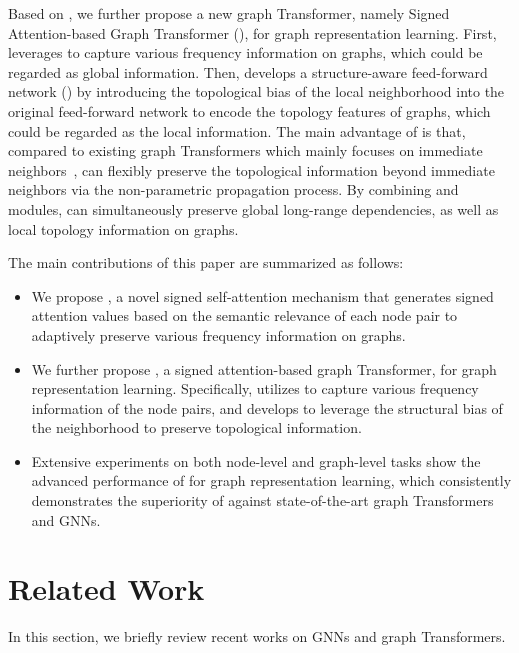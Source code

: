 \documentclass[sigconf, screen]{acmart}
\begin{document}
Based on \saname, we further propose a new graph Transformer, namely Signed Attention-based Graph Transformer (\name), for graph representation learning. 
First, \name leverages \saname to capture various frequency information on graphs, which could be regarded as global information. 
Then, \name develops a structure-aware feed-forward network (\sffn) by introducing the topological bias of the local neighborhood into the original feed-forward network to encode the topology features of graphs, which could be regarded as the local information.
The main advantage of \sffn is that, compared to existing graph Transformers which mainly focuses on immediate neighbors~\cite{nodeformer,gps}, \sffn can  flexibly preserve the topological information beyond immediate neighbors via the non-parametric propagation process.
By combining \saname and \sffn modules, \name can simultaneously preserve global long-range dependencies, as well as local topology information on graphs. 

The main contributions of this paper are summarized as follows:
\begin{itemize}

    \item We propose \saname, a novel signed self-attention mechanism that generates signed attention values based on the semantic relevance of each node pair to adaptively preserve various frequency
    information on graphs.

    \item We further propose \name, a signed attention-based graph Transformer, for graph representation learning. Specifically, \name utilizes \saname to capture 
    various frequency information of the node pairs, and develops \sffn to leverage the structural bias of the neighborhood to preserve topological information.

    \item 
    Extensive experiments on both node-level and graph-level tasks show 
    the advanced performance of \name for graph representation learning, 
    which consistently demonstrates the superiority of \name against state-of-the-art graph Transformers and GNNs. 
    
\end{itemize}

 \section{Related Work}
In this section, we briefly review recent works on GNNs and graph Transformers. 
\end{document}
